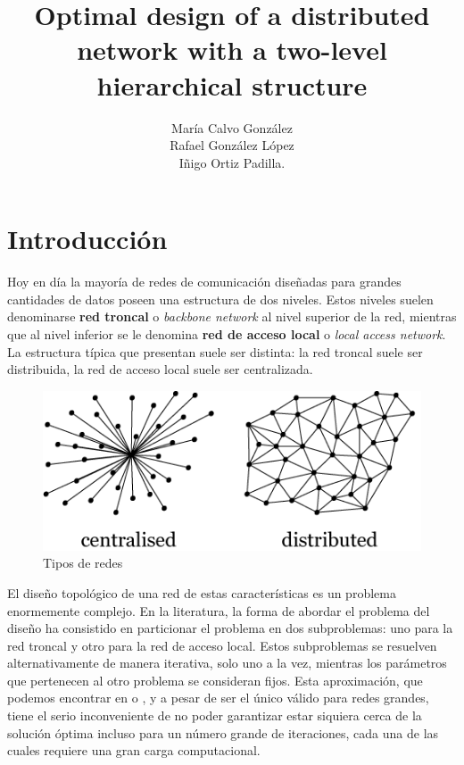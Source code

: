 \documentclass[twoside,12pt]{article}
\begin{document}
\title{Optimal design of a distributed network with a two-level hierarchical structure}
\author{María Calvo González\\ Rafael González López\\ Iñigo Ortiz Padilla.}
\maketitle
\section{Introducción}
Hoy en día la mayoría de redes de comunicación diseñadas para grandes cantidades de datos poseen una estructura de dos niveles. Estos niveles suelen denominarse \textbf{red troncal} o  \textit{backbone network} al nivel superior de la red, mientras que al nivel inferior se le denomina \textbf{red de acceso local} o \textit{local access network}. La estructura típica que presentan suele ser distinta: la red troncal suele ser distribuida, la red de acceso local suele ser centralizada.
\begin{figure}[h!]
\centering
\includegraphics[scale=0.55]{redes}
\caption{Tipos de redes}
\end{figure}

El diseño topológico de una red de estas características es un problema enormemente complejo. En la literatura, la forma de abordar el problema del diseño ha consistido en particionar el problema en dos subproblemas: uno para la red troncal y otro para la red de acceso local. Estos subproblemas se resuelven alternativamente de manera iterativa, solo uno a la vez, mientras los parámetros que pertenecen al otro problema se consideran fijos. Esta aproximación, que podemos encontrar en \cite{bebesita} o \cite{bebesita2}, y a pesar de ser el único válido para redes grandes, tiene el serio inconveniente de no poder garantizar estar siquiera cerca de la solución óptima incluso para un número grande de iteraciones, cada una de las cuales requiere una gran carga computacional.
\end{document}
